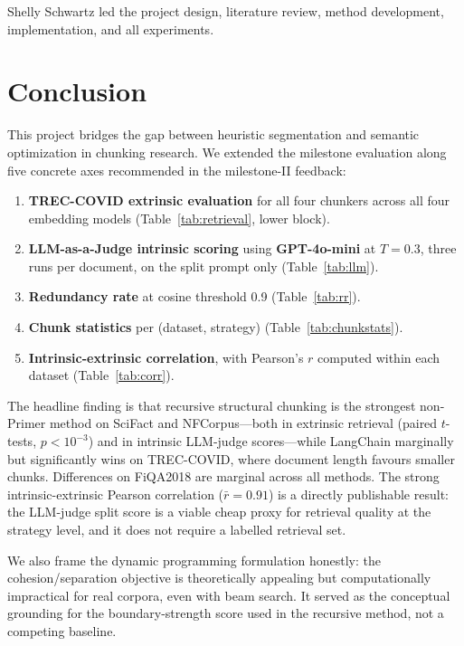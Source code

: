 \documentclass[conference]{IEEEtran}
\begin{document}
Shelly Schwartz led the project design, literature review, method
development, implementation, and all experiments.

\section{Conclusion}

This project bridges the gap between heuristic segmentation and semantic
optimization in chunking research. We extended the milestone evaluation
along five concrete axes recommended in the milestone-II feedback:
\begin{enumerate}
    \item \textbf{TREC-COVID extrinsic evaluation} for all four chunkers
    across all four embedding models (Table~\ref{tab:retrieval}, lower
    block).
    \item \textbf{LLM-as-a-Judge intrinsic scoring} using
    \textbf{GPT-4o-mini} at $T = 0.3$, three runs per document, on the
    split prompt only (Table~\ref{tab:llm}).
    \item \textbf{Redundancy rate} at cosine threshold 0.9
    (Table~\ref{tab:rr}).
    \item \textbf{Chunk statistics} per (dataset, strategy)
    (Table~\ref{tab:chunkstats}).
    \item \textbf{Intrinsic-extrinsic correlation}, with Pearson's $r$
    computed within each dataset (Table~\ref{tab:corr}).
\end{enumerate}

The headline finding is that recursive structural chunking is the
strongest non-Primer method on SciFact and NFCorpus---both in extrinsic
retrieval (paired $t$-tests, $p < 10^{-3}$) and in intrinsic LLM-judge
scores---while LangChain marginally but significantly wins on TREC-COVID,
where document length favours smaller chunks. Differences on FiQA2018 are
marginal across all methods. The strong intrinsic-extrinsic Pearson
correlation ($\bar{r} = 0.91$) is a directly publishable result: the
LLM-judge split score is a viable cheap proxy for retrieval quality at
the strategy level, and it does not require a labelled retrieval set.

We also frame the dynamic programming formulation honestly: the
cohesion/separation objective is theoretically appealing but
computationally impractical for real corpora, even with beam search. It
served as the conceptual grounding for the boundary-strength score used in
the recursive method, not a competing baseline.
\end{document}

